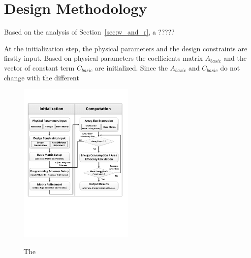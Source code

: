 \vspace{10pt}
\section{Design Methodology}\label{sec:framwork} 
Based on the analysis of Section~\ref{sec:w_and_r}, a ?????

At the initialization step, the physical parameters and the design constraints are firstly input. Based on physical parameters the coefficients matrix $A_{basic}$ and the vector of constant term $C_{basic}$ are initialized. Since the $A_{basic}$ and $C_{basic}$ do not change with the different

\begin{figure}[!t]
\centering
  \includegraphics[width=0.5\textwidth]{./figures/FlowChart.pdf}\\
  \caption{The}\label{fig:FlowChart}
\end{figure}
